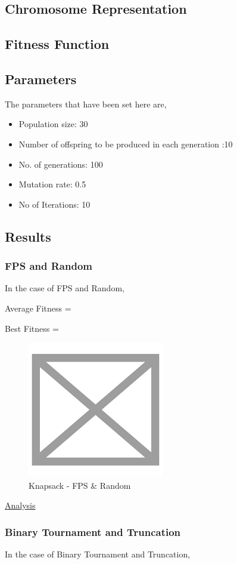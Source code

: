 \documentclass[11pt, letterpaper]{article}
\begin{document}
\subsection{Chromosome Representation}

\subsection{Fitness Function}

\subsection{Parameters}
The parameters that have been set here are,
\begin{itemize}
    \item Population size: 30
    \item Number of offspring to be produced in each generation :10
    \item No. of generations: 100
    \item Mutation rate: 0.5
    \item No of Iterations: 10
\end{itemize}
\subsection{Results} 
\subsubsection {FPS and Random}
In the case of FPS and Random,

Average Fitness =

Best Fitness = 
\begin{figure}[H]
    \centering
    \includegraphics[scale = 0.6]{images/placeHolder.png}
    \caption {Knapsack - FPS \& Random}
    \label {fig:kpFR}
\end{figure}
\underline{Analysis}
\subsubsection {Binary Tournament and Truncation}
In the case of Binary Tournament and Truncation,
\end{document}

